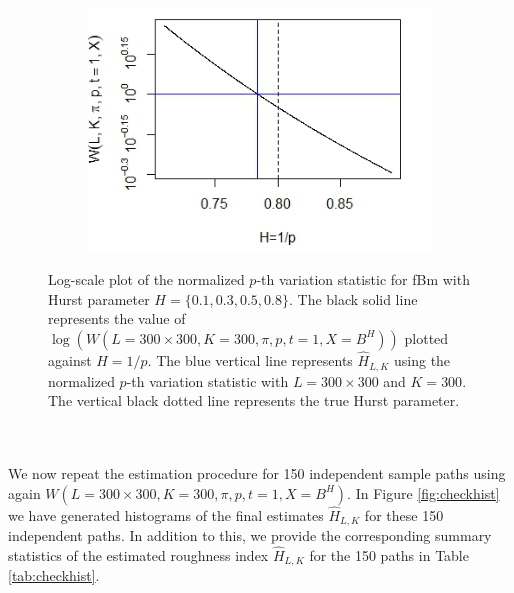\documentclass{article}
\begin{document}
\begin{figure}[htbp]
\begin{subfigure}{0.48\textwidth}
    \end{subfigure}
    \hfill
    \begin{subfigure}{0.48\textwidth}
        \includegraphics[width=\linewidth]{wagainstp_H08.png}
    \end{subfigure}
    
    \caption{Log-scale plot of the normalized $p$-th variation statistic for fBm with Hurst parameter $H=\{0.1,0.3,0.5,0.8\}$. The black solid line represents the value of $\log(W(L=300\times 300, K=300, \pi, p, t=1, X=B^H))$ plotted against $H=1/p$. The blue vertical line represents $\widehat{H}_{L,K}$ using the normalized $p$-th variation statistic with $L=300\times 300$ and $K=300$. The vertical black dotted line represents the true Hurst parameter. }
    \label{fig:checkw}
\end{figure}\\\\
We now repeat the estimation procedure for 150 independent sample paths using again $W(L=300\times 300, K=300, \pi, p, t=1, X=B^H)$. In Figure \ref{fig:checkhist} we have generated histograms of the final estimates $\widehat{H}_{L,K}$ for these 150 independent paths. In addition to this, we provide the corresponding summary statistics of the estimated roughness index $\widehat{H}_{L,K}$ for the 150 paths in Table \ref{tab:checkhist}. \\\\
\end{document}
